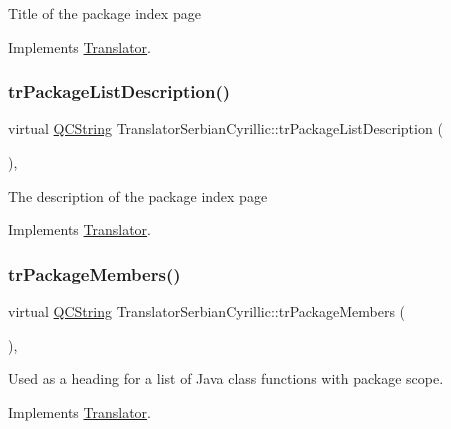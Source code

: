 Title of the package index page 

Implements \mbox{\hyperlink{class_translator}{Translator}}.

\mbox{\label{class_translator_serbian_cyrillic_a46b303143151f097f16f9dbf6670ae32}} 
\subsubsection{\texorpdfstring{trPackageListDescription()}{trPackageListDescription()}}
{\footnotesize\ttfamily virtual \mbox{\hyperlink{class_q_c_string}{Q\+C\+String}} Translator\+Serbian\+Cyrillic\+::tr\+Package\+List\+Description (\begin{DoxyParamCaption}{ }\end{DoxyParamCaption})\hspace{0.3cm}{\ttfamily [inline]}, {\ttfamily [virtual]}}

The description of the package index page 

Implements \mbox{\hyperlink{class_translator}{Translator}}.

\mbox{\label{class_translator_serbian_cyrillic_abd2f75a8de502602ea5fee2d913c7ef7}} 
\subsubsection{\texorpdfstring{trPackageMembers()}{trPackageMembers()}}
{\footnotesize\ttfamily virtual \mbox{\hyperlink{class_q_c_string}{Q\+C\+String}} Translator\+Serbian\+Cyrillic\+::tr\+Package\+Members (\begin{DoxyParamCaption}{ }\end{DoxyParamCaption})\hspace{0.3cm}{\ttfamily [inline]}, {\ttfamily [virtual]}}

Used as a heading for a list of Java class functions with package scope. 

Implements \mbox{\hyperlink{class_translator}{Translator}}.

